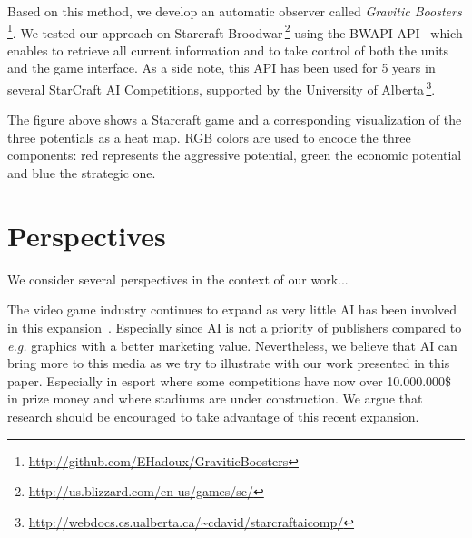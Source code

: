 \documentclass{jfsma}
\begin{document}
Based on this method, we develop an automatic observer called \emph{Gravitic Boosters}\,\footnote{\url{http://github.com/EHadoux/GraviticBoosters}}.
We tested our approach on Starcraft Broodwar\,\footnote{\url{http://us.blizzard.com/en-us/games/sc/}} using
the BWAPI API~\cite{bwapi} which enables to retrieve all current information and to take control of both the units and the game interface.
As a side note, this API has been used for 5 years in several StarCraft AI Competitions, supported by the University of Alberta\,\footnote{\url{http://webdocs.cs.ualberta.ca/~cdavid/starcraftaicomp/}}.

The figure above shows a Starcraft game and a corresponding visualization of the three potentials as a heat map. 
RGB colors are used to encode the three components: red represents the aggressive potential, green the economic potential and blue the strategic one.

\section{Perspectives}
We consider several perspectives in the context of our work...

The video game industry continues to expand as very little AI has been involved in this expansion~\cite{miikkulainen2007creating}. Especially since AI is not a priority of publishers compared to \textit{e.g.} graphics with a better marketing value. Nevertheless, we believe that AI can bring more to this media as we try to illustrate with our work presented in this paper. Especially in esport where some competitions have now over 10.000.000\$ in prize money and where stadiums are under construction.
We argue that research should be encouraged to take advantage of this recent expansion.



\end{document}
